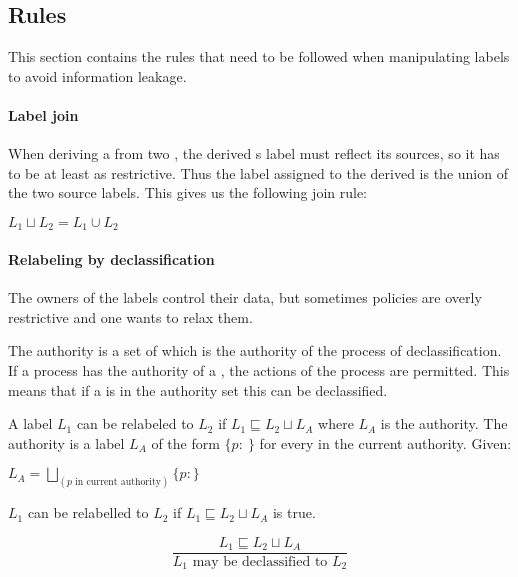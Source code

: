 \subsection{Rules}
This section contains the rules that need to be followed when manipulating labels to avoid information leakage.

\paragraph{Label join}
When deriving a \xvalue{} from two \xvalues{}, the derived \xvalue{}s label must reflect its sources, so it has to be at least as restrictive.
Thus the label assigned to the derived \xvalue{} is the union of the two source labels.
This gives us the following join rule:
\begin{definition}
  $L_1 \sqcup L_2 = L_1 \cup L_2$
\end{definition}


\paragraph{Relabeling by declassification}
The owners of the labels control their data, but sometimes policies are overly restrictive and one wants to relax them.

The authority is a set of \principals{} which is the authority of the process of declassification.
If a process has the authority of a \principal{}, the actions of the process are permitted.
This means that if a \principal{} is in the authority set this can be declassified.

A label $L_1$ can be relabeled to $L_2$ if $L_1 \sqsubseteq L_2 \sqcup L_A$ where $L_A$ is the authority.
The authority is a label $L_A$ of the form $\{p: \ \}$ for every \principal{} in the current authority.
Given:
\begin{center}
  $L_A = \bigsqcup_{(p \text{ in current authority})}\{p: \}$
\end{center}
$L_1$ can be relabelled to $L_2$ if $L_1 \sqsubseteq L_2 \sqcup L_A$ is true.
\begin{definition}
    $$\frac{L_1 \sqsubseteq L_2 \sqcup L_A}{L_1 \text{ may be declassified to } L_2}$$
\end{definition}

